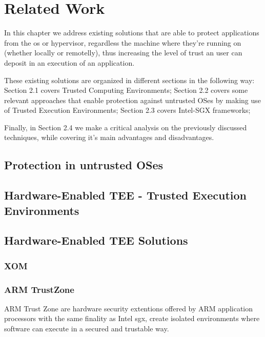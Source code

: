 \chapter{Related Work}
\label{cha:related_work}

In this chapter we address existing solutions that are able to protect applications from the \gls{os} or hypervisor, regardless the machine where they're running on (whether locally or remotelly), thus increasing the level of trust an user can deposit in an execution of an application.

These existing solutions are organized in different sections in the following way: Section 2.1 covers Trusted Computing Environments; Section 2.2 covers some relevant approaches that enable protection against untrusted OSes by making use of Trusted Execution Environments; Section 2.3 covers Intel-SGX frameworks; 

Finally, in Section 2.4 we make a critical analysis on the previously discussed techniques, while covering it's main advantages and disadvantages.

\section{Protection in untrusted OSes}

\section{Hardware-Enabled TEE - Trusted Execution Environments}

\section{Hardware-Enabled TEE Solutions}
\subsection{XOM}
\subsection{ARM TrustZone}
\label{ssec:armtz}

ARM Trust Zone \cite{armTZPaper} are hardware security extentions offered by ARM application processors with the same finality as Intel \gls{sgx}, create isolated environments where software can execute in a secured and trustable way. 

